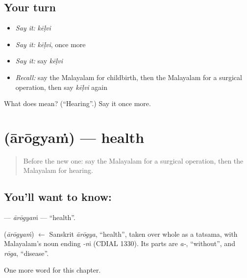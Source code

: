 \subsection*{Your turn}
\begin{itemize}
\raggedright
  \item \emph{Say it:} \emph{kēḷvi}
  \item \emph{Say it:} \emph{kēḷvi}, once more
  \item \emph{Say it:} say \emph{kēḷvi}
  \item \emph{Recall:} say the Malayalam for childbirth, then the Malayalam for a surgical operation, then say \emph{kēḷvi} again
\end{itemize}

\begin{tcolorbox}[breakable,colback=teal!4,colframe=teal!35!black,title={Before you move on}]
What does  mean? (\textquotedblleft{}Hearing\textquotedblright{}.) Say it once more.
\end{tcolorbox}
\section[\texorpdfstring{\ml{ആരോഗ്യം} (ārōgyaṁ)}{ആരോഗ്യം (ārōgyaṁ)}]{ (ārōgyaṁ) — health}

\label{lesson:ML-C194-arogyam}



\begin{quote}
Before the new one: say the Malayalam for a surgical operation, then the Malayalam for hearing.
\end{quote}

\subsection*{You'll want to know: }
\textbf{} — \emph{ārōgyaṁ} — \textquotedblleft{}health\textquotedblright{}.

\begin{cousinweb}
\textbf{} (\emph{ārōgyaṁ}) $\leftarrow$ Sanskrit \emph{ārōgya}, \textquotedblleft{}health\textquotedblright{}, taken over whole as a tatsama, with Malayalam's noun ending \emph{-ṁ} (CDIAL 1330). Its parts are \emph{a-}, \textquotedblleft{}without\textquotedblright{}, and \emph{rōga}, \textquotedblleft{}disease\textquotedblright{}.
\end{cousinweb}

\begin{grammarlens}[title={What you've built}]
One more word for this chapter.
\end{grammarlens}

